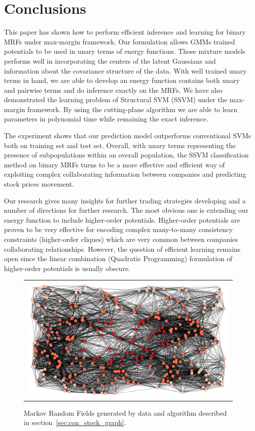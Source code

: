 \section{Conclusions}
\label{sec:conclusion}

This paper has shown how to perform efficient inference and
learning for binary MRFs under max-margin framework. Our
formulation allows GMMs trained potentials to be used in unary
terms of energy functions. Those mixture models performs well in
incorporating the centers of the latent Gaussians and information
about the covariance structure of the data. With well trained
unary terms in hand, we are able to develop an energy function
contains both unary and pairwise terms and do inference exactly
on the MRFs. We have also demonstrated the learning problem of
Structural SVM (SSVM) under the max-margin framework. By using
the cutting-plane algorithm we are able to learn parameters in
polynomial time while remaining the exact inference.

The experiment shows that our prediction model outperforms
conventional SVMs both on training set and test set. Overall,
with unary terms representing the presence of subpopulations
within an overall population, the SSVM classification method on
binary MRFs turns to be a more effective and efficient way of
exploiting complex collaborating information between companies
and predicting stock prices movement.

Our research gives many insights for further trading strategies
developing and a number of directions for further research. The
most obvious one is extending our energy function to include
higher-order potentials. Higher-order potentials are proven to be
very effective for encoding complex many-to-many consistency
constraints (higher-order cliques) which are very common between
companies collaborating relationships. However, the question of
efficient learning remains open since the linear combination
(Quadratic Programming) formulation of higher-order potentials is
usually obscure.

\begin{figure}[!t]
  \centering
  \setlength{\tabcolsep}{2pt}
  \begin{tabular}{c}
    \includegraphics[width=0.7\linewidth]{Experiments/figures/network_image.png}
  \end{tabular}
  \caption{\label{fig:synthetic_weights} Markov Random Fields
    generated by data and algorithm described in section~\ref{sec:con_stock_graph}.}
  \vspace*{6in}
\end{figure}


